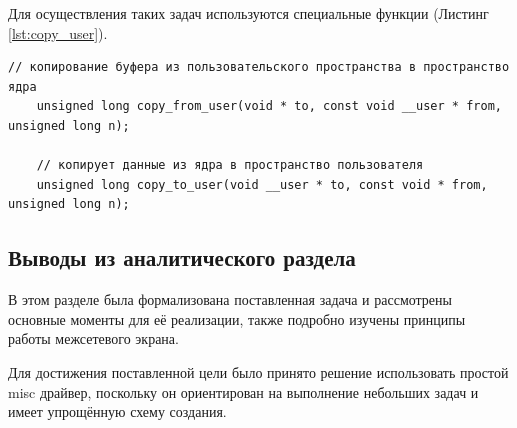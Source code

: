 Для осуществления таких задач используются специальные функции (Листинг \ref{lst:copy_user}).

\begin{lstlisting}[caption = {Специальные функции}, label=lst:copy_user]
	// копирование буфера из пользовательского пространства в пространство ядра
	unsigned long copy_from_user(void * to, const void __user * from, unsigned long n);
	
	// копирует данные из ядра в пространство пользователя
	unsigned long copy_to_user(void __user * to, const void * from, unsigned long n);
\end{lstlisting}

\subsection{Выводы из аналитического раздела}
В этом разделе была формализована поставленная задача и рассмотрены основные моменты для её реализации, также подробно изучены принципы работы межсетевого экрана. 

Для достижения поставленной цели было принято решение использовать простой misc драйвер, поскольку он ориентирован на выполнение небольших задач и имеет упрощённую схему создания.


 